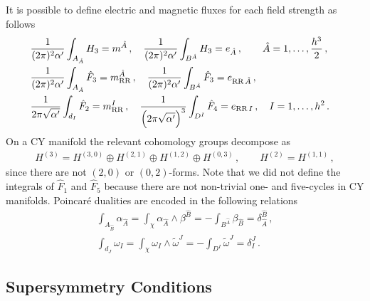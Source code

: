 \documentclass[12pt,a4paper]{book}
\begin{document}
It is possible to define electric and magnetic fluxes for each field strength as follows
\begin{align}
\label{eq:ElectricMagneticFluxes}
&\frac{1}{(2 \pi)^2 \alpha'} \int_{A_{\hat{A}}} H_3 = m^{\hat{A}}\,, \quad \frac{1}{(2 \pi)^2 \alpha'} \int_{B^{\hat{A}}} H_3 = e_{\hat{A}} \,, \qquad {\hat{A}} = 1, \dots, \frac{h^3}{2} \,,& \nonumber \\
&\frac{1}{(2 \pi)^2 \alpha'} \int_{A_{\hat{A}}} \hat{F}_3 = m^{\hat{A}}_{\rm RR}\,, \quad \frac{1}{(2 \pi)^2 \alpha'} \int_{B^{\hat{A}}} \hat{F}_3 = e_{\text{RR}\, {\hat{A}}} \,,& \\
&\frac{1}{2 \pi \sqrt{\alpha'}} \int_{d_I} \hat{F}_2 = m^I_{\rm RR}\,, \quad \frac{1}{\left(2 \pi \sqrt{\alpha'}\right)^3} \int_{D^I} \hat{F}_4 = e_{\text	{RR}\, I} \,, \quad I = 1, \dots, h^2 \,.& \nonumber
\end{align}
On a CY manifold the relevant cohomology groups decompose as
\begin{align}
H^{(3)} = H^{(3,0)} \oplus H^{(2,1)} \oplus H^{(1,2)} \oplus H^{(0,3)}\,, \qquad H^{(2)} = H^{(1,1)}\,,
\end{align}
since there are not $(2,0)$ or $(0,2)$-forms. Note that we did not define the integrals of $\hat{F}_1$ and $\hat{F}_5$ because there are not non-trivial one- and five-cycles in CY manifolds. Poincar\'e dualities are encoded in the following relations
\begin{align}
\label{eq:PoincareDuals}
\int_{A_{\hat{B}}} \alpha_{\hat{A}} = \int_{\chi} \alpha_{\hat{A}} \wedge \beta^{\hat{B}} = - \int_{B^{\hat{A}}} \beta_{\hat{B}} = \delta^{\hat{B}}_{\hat{A}}\,, \nonumber \\
\int_{d_J} \omega_I = \int_{\chi} \omega_I \wedge \tilde{\omega}^J = - \int_{D^I} \tilde{\omega}^J = \delta^J_I\,.
\end{align}

\subsection{Supersymmetry Conditions}
\label{ssec:SUSYConditions}
\end{document}
